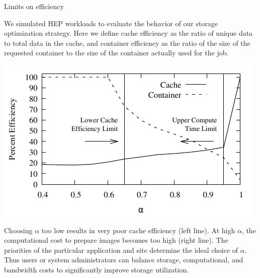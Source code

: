 \documentclass{beamer}
\newenvironment{BlueBlock}[1]
{\begin{alertblock}{#1\rule{0pt}{2.3ex}} \vspace*{16pt}}
{\end{alertblock}}
\begin{document}
\begin{frame}[fragile]
\begin{minipage}[t][0.93\textheight]{0.32\textwidth}
\vfill

\begin{BlueBlock}{Limits on efficiency}
\centering

\parbox{\linewidth}{
We simulated HEP workloads to evaluate the behavior of our storage optimization strategy.
Here we define cache efficiency as the ratio of unique data to total data in the cache,
and container efficiency as the ratio of the size of the requested container
to the size of the container actually used for the job.
}

\includegraphics[width=0.9\linewidth]{curated/comparative/distribution_efficiency.pdf}

\parbox{\linewidth}{
Choosing $\alpha$ too low results in very poor cache efficiency (left line).
At high $\alpha$, the computational cost to prepare images becomes too high (right line).
The priorities of the particular application and site determine the ideal choice of $\alpha$.
Thus users or system administrators can balance storage, computational, and bandwidth costs to  significantly improve storage utilization.
}
\end{BlueBlock}

\end{minipage}
\end{frame}
\end{document}
